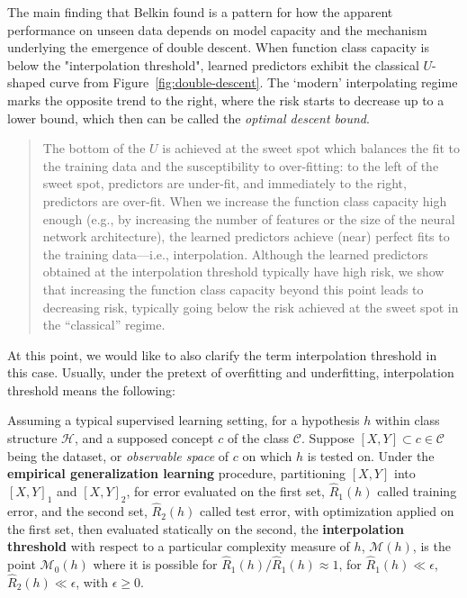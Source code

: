 \documentclass[10pt]{article} %
\begin{document}
The main finding that Belkin found is a pattern for how the apparent performance on unseen data depends on model capacity and the mechanism underlying the emergence of double descent. When function class capacity is below the "interpolation threshold", learned predictors exhibit the classical $U$-shaped curve from Figure~\ref{fig:double-descent}. The `modern' interpolating regime marks the opposite trend to the right, where the risk starts to decrease up to a lower bound, which then can be called the \textit{optimal descent bound}. 

\blockquote[\cite{belkin_reconciling_2019}]{The bottom of the $U$ is achieved at the sweet spot which balances the fit to the training data and the susceptibility to over-fitting:
to the left of the sweet spot, predictors are under-fit, and immediately to the right, predictors are over-fit.
When we increase the function class capacity high enough (e.g., by increasing the number of features or the size of the neural network architecture), the learned predictors achieve (near) perfect fits to the training data---i.e., interpolation.
Although the learned predictors obtained at the interpolation threshold typically have high risk, we show that increasing the function class capacity beyond this point leads to decreasing risk, typically going below the risk achieved at the sweet spot in the ``classical'' regime.}

At this point, we would like to also clarify the term interpolation threshold in this case. Usually, under the pretext of overfitting and underfitting, interpolation threshold means the following: 
\vspace{2mm}

\begin{definition}
    Assuming a typical supervised learning setting, for a hypothesis $h$ within class structure $\mathcal{H}$, and a supposed concept $c$ of the class $\mathcal{C}$. Suppose $[X,Y]\subset c\in \mathcal{C}$ being the dataset, or \textit{observable space} of $c$ on which $h$ is tested on. Under the \textbf{empirical generalization learning} procedure, partitioning $[X,Y]$ into $[X,Y]_{1}$ and $[X,Y]_{2}$, for error evaluated on the first set, $\hat{R}_{1}(h)$ called training error, and the second set, $\hat{R}_{2}(h)$ called test error, with optimization applied on the first set, then evaluated statically on the second, the \textbf{interpolation threshold} with respect to a particular complexity measure of $h$, $\mathcal{M}(h)$, is the point $\mathcal{M}_{0}(h)$ where it is possible for $\hat{R}_{1}(h)/\hat{R}_{1}(h)\approx 1$, for $\hat{R}_{1}(h)\ll \epsilon$, $\hat{R}_{2}(h)\ll \epsilon$, with $\epsilon \geq 0$. 
\end{definition}
\end{document}
